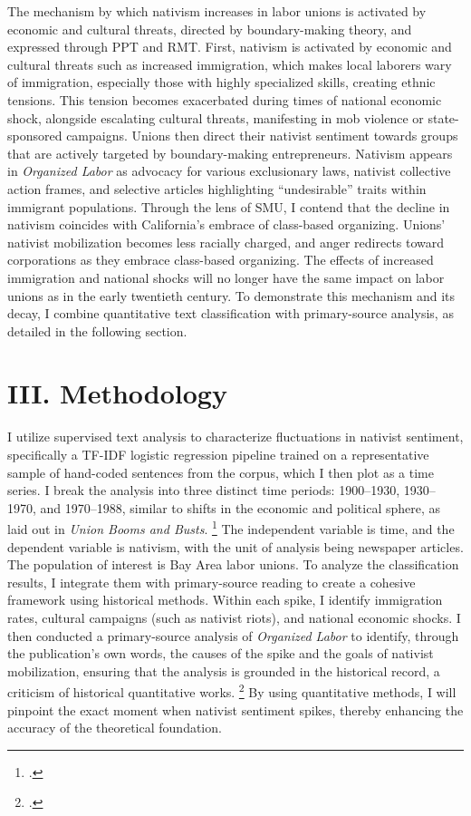 \documentclass[12pt,a4paper]{article}
\begin{document}
The mechanism by which nativism increases in labor unions is activated by economic and cultural threats, directed by boundary-making theory, and expressed through PPT and RMT. First, nativism is activated by economic and cultural threats such as increased immigration, which makes local laborers wary of immigration, especially those with highly specialized skills, creating ethnic tensions. This tension becomes exacerbated during times of national economic shock, alongside escalating cultural threats, manifesting in mob violence or state-sponsored campaigns. Unions then direct their nativist sentiment towards groups that are actively targeted by boundary-making entrepreneurs. Nativism appears in \textit{Organized Labor} as advocacy for various exclusionary laws, nativist collective action frames, and selective articles highlighting ``undesirable'' traits within immigrant populations. Through the lens of SMU, I contend that the decline in nativism coincides with California's embrace of class-based organizing. Unions' nativist mobilization becomes less racially charged, and anger redirects toward corporations as they embrace class-based organizing. The effects of increased immigration and national shocks will no longer have the same impact on labor unions as in the early twentieth century. To demonstrate this mechanism and its decay, I combine quantitative text classification with primary-source analysis, as detailed in the following section.


\section*{III. Methodology}

I utilize supervised text analysis to characterize fluctuations in nativist sentiment, specifically a TF-IDF logistic regression pipeline trained on a representative sample of hand-coded sentences from the corpus, which I then plot as a time series. I break the analysis into three distinct time periods: 1900--1930, 1930--1970, and 1970--1988, similar to shifts in the economic and political sphere, as laid out in \textit{Union Booms and Busts}. \footcite{stepan-norris_union_2023} The independent variable is time, and the dependent variable is nativism, with the unit of analysis being newspaper articles. The population of interest is Bay Area labor unions. To analyze the classification results, I integrate them with primary-source reading to create a cohesive framework using historical methods. Within each spike, I identify immigration rates, cultural campaigns (such as nativist riots), and national economic shocks. I then conducted a primary-source analysis of \textit{Organized Labor} to identify, through the publication's own words, the causes of the spike and the goals of nativist mobilization, ensuring that the analysis is grounded in the historical record, a criticism of historical quantitative works. \footcite{monkkonen_challenge_1984} By using quantitative methods, I will pinpoint the exact moment when nativist sentiment spikes, thereby enhancing the accuracy of the theoretical foundation. 
\end{document}
